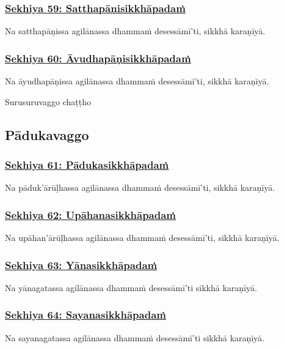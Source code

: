 \subsubsection*{\hyperref[training59]{Sekhiya 59: Satthapāṇisikkhāpadaṁ}}
\label{sekh59}
Na satthapāṇissa agilānassa dhammaṁ desessāmī'ti, sikkhā karaṇīyā.

\subsubsection*{\hyperref[training60]{Sekhiya 60: Āvudhapāṇisikkhāpadaṁ}}
\label{sekh60}
Na āyudhapāṇissa agilānassa dhammaṁ desessāmī'ti, sikkhā karaṇīyā.

\begin{center}
  Surusuruvaggo chaṭṭho
\end{center}

\subsection{Pādukavaggo}
\vspace{0.2cm}

\subsubsection*{\hyperref[training61]{Sekhiya 61: Pādukasikkhāpadaṁ}}
\label{sekh61}
Na pāduk'ārūḷhassa agilānassa dhammaṁ desessāmī'ti, sikkhā karaṇīyā.

\subsubsection*{\hyperref[training62]{Sekhiya 62: Upāhanasikkhāpadaṁ}}
\label{sekh62}
Na upāhan'ārūḷhassa agilānassa dhammaṁ desessāmī'ti, sikkhā karaṇīyā.

\subsubsection*{\hyperref[training63]{Sekhiya 63: Yānasikkhāpadaṁ}}
\label{sekh63}
Na yānagatassa agilānassa dhammaṁ desessāmī'ti sikkhā karaṇīyā.

\subsubsection*{\hyperref[training64]{Sekhiya 64: Sayanasikkhāpadaṁ}}
\label{sekh64}
Na sayanagatassa agilānassa dhammaṁ desessāmī'ti sikkhā karaṇīyā.

